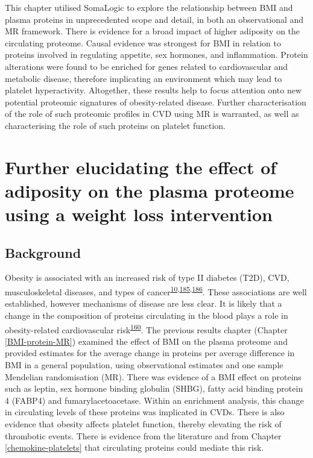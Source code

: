 \documentclass[11pt,twoside]{bristolthesis}
\begin{document}
This chapter utilised SomaLogic to explore the relationship between BMI and plasma proteins in unprecedented scope and detail, in both an observational and MR framework. There is evidence for a broad impact of higher adiposity on the circulating proteome. Causal evidence was strongest for BMI in relation to proteins involved in regulating appetite, sex hormones, and inflammation. Protein alterations were found to be enriched for genes related to cardiovascular and metabolic disease, therefore implicating an environment which may lead to platelet hyperactivity. Altogether, these results help to focus attention onto new potential proteomic signatures of obesity-related disease. Further characterisation of the role of such proteomic profiles in CVD using MR is warranted, as well as characterising the role of such proteins on platelet function.

\hypertarget{BMI-protein-RCT}{%
\chapter{Further elucidating the effect of adiposity on the plasma proteome using a weight loss intervention}\label{BMI-protein-RCT}}

\hypertarget{background-4}{%
\section{Background}\label{background-4}}

Obesity is associated with an increased risk of type II diabetes (T2D), CVD, musculoskeletal diseases, and types of cancer\textsuperscript{\protect\hyperlink{ref-Khan2018}{10},\protect\hyperlink{ref-Garg2014}{185},\protect\hyperlink{ref-Kortt2002}{186}}. These associations are well established, however mechanisms of disease are less clear. It is likely that a change in the composition of proteins circulating in the blood plays a role in obesity-related cardiovascular risk\textsuperscript{\protect\hyperlink{ref-Goudswaard2021}{160}}. The previous results chapter (Chapter \ref{BMI-protein-MR}) examined the effect of BMI on the plasma proteome and provided estimates for the average change in proteins per average difference in BMI in a general population, using observational estimates and one sample Mendelian randomisation (MR). There was evidence of a BMI effect on proteins such as leptin, sex hormone binding globulin (SHBG), fatty acid binding protein 4 (FABP4) and fumarylacetoacetase. Within an enrichment analysis, this change in circulating levels of these proteins was implicated in CVDs. There is also evidence that obesity affects platelet function, thereby elevating the risk of thrombotic events. There is evidence from the literature and from Chapter \ref{chemokine-platelets} that circulating proteins could mediate this risk.
\end{document}

